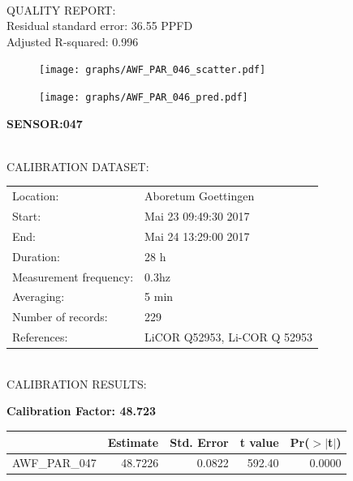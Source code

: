 \documentclass[oneside]{report}
\begin{document}
\hrulefill\\
QUALITY REPORT:\\
Residual standard error: 36.55 PPFD\\
Adjusted R-squared: 0.996



\begin{figure}[H]
  \centering
  \texttt{[image: graphs/AWF\_PAR\_046\_scatter.pdf]}
\end{figure}




\begin{figure}[H]
  \centering
  \texttt{[image: graphs/AWF\_PAR\_046\_pred.pdf]}
\end{figure}

\pagebreak


\begin{center}
\large{\textbf{SENSOR:047}}\\
\end{center}

\hrulefill\\
CALIBRATION DATASET:\\
\begin{table}[h!]
  \centering
  \label{tab:table1}
  \begin{tabular}{ll}
    Location: & Aboretum Goettingen\\ 
    
    
    Start:  & Mai 23 09:49:30 2017 \\
    End:   & Mai 24 13:29:00 2017\\ 
    Duration: & 28 h\\
    Measurement frequency: & 0.3hz\\
    Averaging:  &5 min\\
    Number of records: & 229 \\
    References: & LiCOR Q52953, Li-COR Q 52953 \\
  \end{tabular}
\end{table}

\hrulefill\\
CALIBRATION RESULTS:\\


\begin{center}
\textbf{\large{Calibration Factor: 48.723}}\\
\end{center}
\begin{table}[ht]
\centering
\begin{tabular}{rrrrr}
  \hline
 & Estimate & Std. Error & t value & Pr($>$$|$t$|$) \\ 
  \hline
AWF\_PAR\_047 & 48.7226 & 0.0822 & 592.40 & 0.0000 \\ 
   \hline
\end{tabular}
\end{table}
\end{document}
